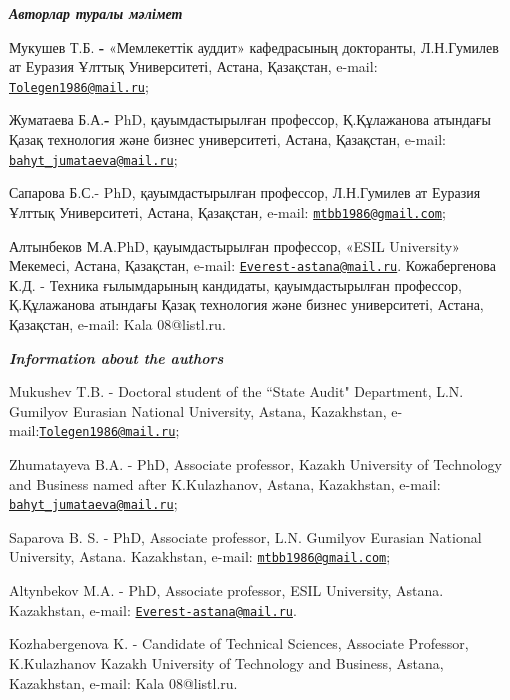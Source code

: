 \begin{authorinfo}
\hspace{1em}\emph{{\bfseries Авторлар туралы мәлімет}}

Мукушев Т.Б. {\bfseries -} «Мемлекеттік ауддит» кафедрасының докторанты,
Л.Н.Гумилев ат Еуразия Ұлттық Университеті, Астана, Қазақстан, e-mail:
\href{mailto:Tolegen1986@mail.ru}{\nolinkurl{Tolegen1986@mail.ru}};

Жуматаева Б.А.{\bfseries -} PhD, қауымдастырылған профессор, Қ.Құлажанова
атындағы Қазақ технология және бизнес университеті, Астана, Қазақстан,
e-mail:
\href{mailto:bahyt_jumataeva@mail.ru}{\nolinkurl{bahyt\_jumataeva@mail.ru}};

Сапарова Б.С.- PhD, қауымдастырылған профессор, Л.Н.Гумилев ат Еуразия
Ұлттық Университеті, Астана, Қазақстан\emph{,} e-mail:
\href{mailto:mtbb1986@gmail.com}{\nolinkurl{mtbb1986@gmail.com}};

Алтынбеков М.А.PhD, қауымдастырылған профессор, «ESIL University»
Мекемесі, Астана, Қазақстан, e-mail:
\href{mailto:Everest-astana@mail.ru}{\nolinkurl{Everest-astana@mail.ru}}.
Кожабергенова К.Д. - Техника ғылымдарының кандидаты, қауымдастырылған профессор, Қ.Құлажанова  атындағы Қазақ технология және бизнес университеті,
Астана, Қазақстан, e-mail: Kala 08@listl.ru.

\hspace{1em}\emph{{\bfseries Information about the authors}}

Mukushev T.B. - Doctoral student of the ``State Audit" Department, L.N.
Gumilyov Eurasian National University, Astana, Kazakhstan,
e-mail:\href{mailto:Tolegen1986@mail.ru}{\nolinkurl{Tolegen1986@mail.ru}};

Zhumatayeva B.A. - PhD, Associate professor, Kazakh University of
Technology and Business named after K.Kulazhanov, Astana, Kazakhstan,
e-mail:
\href{mailto:bahyt_jumataeva@mail.ru}{\nolinkurl{bahyt\_jumataeva@mail.ru}};

Saparova B. S. - PhD, Associate professor, L.N. Gumilyov Eurasian
National University, Astana. Kazakhstan, e-mail:
\href{mailto:mtbb1986@gmail.com}{\nolinkurl{mtbb1986@gmail.com}};

Altynbekov M.A. - PhD, Associate professor, ESIL University, Astana.
Kazakhstan, e-mail:
\href{mailto:Everest-astana@mail.ru}{\nolinkurl{Everest-astana@mail.ru}}.

Kozhabergenova K. - Candidate of Technical Sciences, Associate Professor, K.Kulazhanov Kazakh University of Technology and Business,
 Astana, Kazakhstan, e-mail: Kala 08@listl.ru.
\end{authorinfo}

